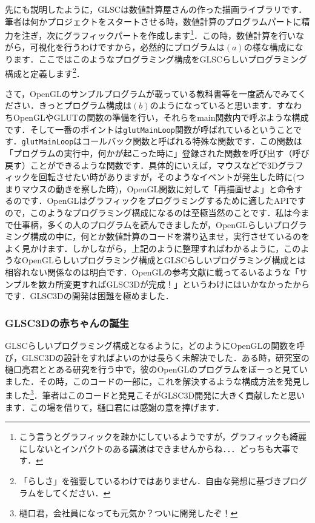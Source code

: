 \documentclass[platex,a4paper,12pt]{jsarticle}%
\begin{document}
先にも説明したように，GLSCは数値計算屋さんの作った描画ライブラリです．筆者は何かプロジェクトをスタートさせる時，数値計算のプログラムパートに精力を注ぎ，次にグラフィックパートを作成します\footnote{こう言うとグラフィックを疎かにしているようですが，グラフィックも綺麗にしないとインパクトのある講演はできませんからね．．．どっちも大事です．}．この時，数値計算を行いながら，可視化を行うわけですから，必然的にプログラムは$(a)$の様な構成になります．ここではこのようなプログラミング構成をGLSCらしいプログラミング構成と定義します\footnote{「らしさ」を強要しているわけではありません．自由な発想に基づきプログラムをしてください．}．

さて，OpenGLのサンプルプログラムが載っている教科書等を一度読んでみてください．きっとプログラム構成は$(b)$のようになっていると思います．すなわちOpenGLやGLUTの関数の準備を行い，それらをmain関数内で呼ぶような構成です．そして一番のポイントは\verb|glutMainLoop|関数が呼ばれているということです．\verb|glutMainLoop|はコールバック関数と呼ばれる特殊な関数です．この関数は「プログラムの実行中，何かが起こった時に」登録された関数を呼び出す（呼び戻す）ことができるような関数です．具体的にいえば，マウスなどで3Dグラフィックを回転させたい時がありますが，そのようなイベントが発生した時に(つまりマウスの動きを察した時)，OpenGL関数に対して「再描画せよ」と命令するのです．OpenGLはグラフィックをプログラミングするために適したAPIですので，このようなプログラミング構成になるのは至極当然のことです．私は今まで仕事柄，多くの人のプログラムを読んできましたが，OpenGLらしいプログラミング構成の中に，何とか数値計算のコードを潜り込ませ，実行させているのをよく見かけます．しかしながら，上記のように整理すればわかるように，このようなOpenGLらしいプログラミング構成とGLSCらしいプログラミング構成とは相容れない関係なのは明白です．OpenGLの参考文献に載ってるいるような「サンプルを数カ所変更すればGLSC3Dが完成！」というわけにはいかなかったからです．GLSC3Dの開発は困難を極めました．

\subsubsection{GLSC3Dの赤ちゃんの誕生}

GLSCらしいプログラミング構成となるように，どのようにOpenGLの関数を呼び，GLSC3Dの設計をすればよいのかは長らく未解決でした．ある時，研究室の樋口亮君ととある研究を行う中で，彼のOpenGLのプログラムをぼーっと見ていました．その時，このコードの一部に，これを解決するような構成方法を発見しました\footnote{樋口君，会社員になっても元気か？ついに開発したぞ！}．筆者はこのコードと発見こそがGLSC3D開発に大きく貢献したと思います．この場を借りて，樋口君には感謝の意を捧げます．
\end{document}
